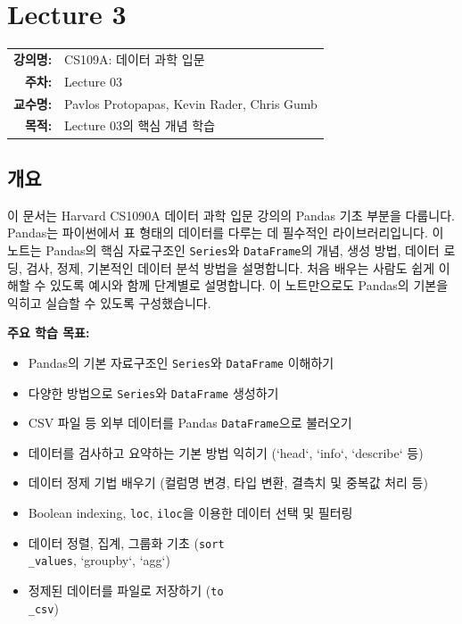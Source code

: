 \documentclass[11pt,a4paper]{book}
\makeatletter
\theoremstyle{definition}
\newcommand{\metainfo}[4]{
\begin{tcolorbox}[
    colback=lightpurple,
    colframe=darkpurple,
    boxrule=1pt,
    arc=2mm,
    left=10pt,
    right=10pt,
    top=8pt,
    bottom=8pt
]
\begin{tabular}{@{}rl@{}}
\textbf{강의명:} & #1 \\[0.3em]
\textbf{주차:} & #2 \\[0.3em]
\textbf{교수명:} & #3 \\[0.3em]
\textbf{목적:} & \begin{minipage}[t]{0.75\textwidth}#4\end{minipage}
\end{tabular}
\end{tcolorbox}
}
\makeatother
\begin{document}
\chapter{Lecture 3}
\label{ch:lecture3}

\metainfo{CS109A: 데이터 과학 입문}{Lecture 03}{Pavlos Protopapas, Kevin Rader, Chris Gumb}{Lecture 03의 핵심 개념 학습}


\section{개요}

\begin{summarybox}
이 문서는 Harvard CS1090A 데이터 과학 입문 강의의 Pandas 기초 부분을 다룹니다. Pandas는 파이썬에서 표 형태의 데이터를 다루는 데 필수적인 라이브러리입니다. 이 노트는 Pandas의 핵심 자료구조인 \texttt{Series}와 \texttt{DataFrame}의 개념, 생성 방법, 데이터 로딩, 검사, 정제, 기본적인 데이터 분석 방법을 설명합니다. 처음 배우는 사람도 쉽게 이해할 수 있도록 예시와 함께 단계별로 설명합니다. 이 노트만으로도 Pandas의 기본을 익히고 실습할 수 있도록 구성했습니다.
\end{summarybox}

\textbf{주요 학습 목표:}
\begin{itemize}
    \item Pandas의 기본 자료구조인 \texttt{Series}와 \texttt{DataFrame} 이해하기
    \item 다양한 방법으로 \texttt{Series}와 \texttt{DataFrame} 생성하기
    \item CSV 파일 등 외부 데이터를 Pandas \texttt{DataFrame}으로 불러오기
    \item 데이터를 검사하고 요약하는 기본 방법 익히기 (`head`, `info`, `describe` 등)
    \item 데이터 정제 기법 배우기 (컬럼명 변경, 타입 변환, 결측치 및 중복값 처리 등)
    \item Boolean indexing, \texttt{loc}, \texttt{iloc}을 이용한 데이터 선택 및 필터링
    \item 데이터 정렬, 집계, 그룹화 기초 (\texttt{sort\\_values}, `groupby`, `agg`)
    \item 정제된 데이터를 파일로 저장하기 (\texttt{to\\_csv})
\end{itemize}
\end{document}
